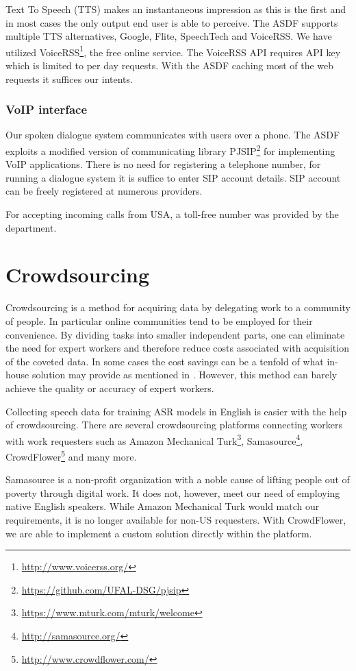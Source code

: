 Text To Speech (TTS) makes an instantaneous impression as this is the first and in most cases the only output end user is able to perceive. %
The ASDF supports multiple TTS alternatives, Google, Flite, SpeechTech and VoiceRSS.
We have utilized VoiceRSS\footnote{\url{http://www.voicerss.org/}}, the free online service.
The VoiceRSS API requires API key which is limited to per day requests.
With the ASDF caching most of the web requests it suffices our intents.

\subsubsection{VoIP interface}

Our spoken dialogue system communicates with users over a phone.
The ASDF exploits a modified version of communicating library PJSIP\footnote{\url{https://github.com/UFAL-DSG/pjsip}} for implementing VoIP applications.
There is no need for registering a telephone number, for running a dialogue system it is suffice to enter SIP account details.
SIP account can be freely registered at numerous providers.

For accepting incoming calls from USA, a toll-free number was provided by the department.

\section{Crowdsourcing}

Crowdsourcing is a method for acquiring data by delegating work to a community of people.
In particular online communities tend to be employed for their convenience.
By dividing tasks into smaller independent parts, one can eliminate the need for expert workers and therefore reduce costs associated with acquisition of the coveted data.
In some cases the cost savings can be a tenfold of what in-house solution may provide as mentioned in \cite{mturk}. %
However, this method can barely achieve the quality or accuracy of expert workers.

Collecting speech data for training ASR models in English is easier with the help of crowdsourcing.
There are several crowdsourcing platforms connecting workers with work requesters such as
Amazon Mechanical Turk\footnote{\url{https://www.mturk.com/mturk/welcome}},
Samasource\footnote{\url{http://samasource.org/}},
CrowdFlower\footnote{\url{http://www.crowdflower.com/}}
and many more.

Samasource is a non-profit organization with a noble cause of lifting people out of poverty through digital work.
It does not, however, meet our need of employing native English speakers.
While Amazon Mechanical Turk would match our requirements, it is no longer available for non-US requesters.
With CrowdFlower, we are able to implement a custom solution directly within the platform.

